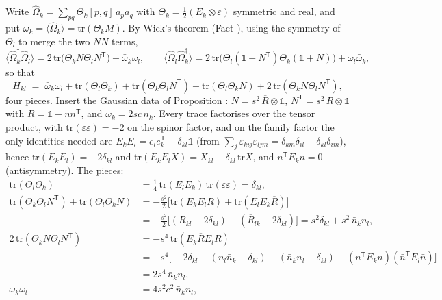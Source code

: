 Write $\hat\Omega_{k} = \sum_{pq}\Theta_{k}[p,q]\,a_{p}a_{q}$ with $\Theta_{k} = \tfrac12(E_{k} \otimes \varepsilon)$ symmetric and real, and put $\omega_{k} = \langle\hat\Omega_{k}\rangle = \mathrm{tr}(\Theta_{k}M)$. By Wick's theorem (Fact ), using the symmetry of $\Theta_{l}$ to merge the two $NN$ terms,
\[
\langle\hat\Omega_{k}^{\dagger}\hat\Omega_{l}\rangle = 2\,\mathrm{tr}\bigl(\Theta_{k}N\Theta_{l}N^{\mathsf{T}}\bigr) + \bar\omega_{k}\omega_{l}, \qquad
\langle\hat\Omega_{l}\hat\Omega_{k}^{\dagger}\rangle = 2\,\mathrm{tr}\bigl(\Theta_{l}(\mathbb{1}+N^{\mathsf{T}})\Theta_{k}(\mathbb{1}+N)\bigr) + \omega_{l}\bar\omega_{k},
\]
so that
\[
H_{kl} \;=\; \bar\omega_{k}\omega_{l} + \mathrm{tr}(\Theta_{l}\Theta_{k}) + \mathrm{tr}(\Theta_{k}\Theta_{l}N^{\mathsf{T}}) + \mathrm{tr}(\Theta_{l}\Theta_{k}N) + 2\,\mathrm{tr}(\Theta_{k}N\Theta_{l}N^{\mathsf{T}}),
\]
four pieces. Insert the Gaussian data of Proposition : $N = s^{2}\,\overline{R} \otimes \mathbb{1}$, $N^{\mathsf{T}} = s^{2}\,R \otimes \mathbb{1}$ with $R = \mathbb{1} - \bar{n}n^{\mathsf{T}}$, and $\omega_{k} = 2sc\,n_{k}$. Every trace factorises over the tensor product, with $\mathrm{tr}(\varepsilon\varepsilon) = -2$ on the spinor factor, and on the family factor the only identities needed are $E_{k}E_{l} = e_{l}e_{k}^{\mathsf{T}} - \delta_{kl}\mathbb{1}$ (from $\sum_{j}\varepsilon_{kij}\varepsilon_{ljm} = \delta_{km}\delta_{il} - \delta_{kl}\delta_{im}$), hence $\mathrm{tr}(E_{k}E_{l}) = -2\delta_{kl}$ and $\mathrm{tr}(E_{k}E_{l}X) = X_{kl} - \delta_{kl}\,\mathrm{tr}X$, and $n^{\mathsf{T}}E_{k}n = 0$ (antisymmetry). The pieces:
\begin{align*}
\mathrm{tr}(\Theta_{l}\Theta_{k}) &= \tfrac14\,\mathrm{tr}(E_{l}E_{k})\,\mathrm{tr}(\varepsilon\varepsilon) = \delta_{kl},\\
\mathrm{tr}(\Theta_{k}\Theta_{l}N^{\mathsf{T}}) + \mathrm{tr}(\Theta_{l}\Theta_{k}N) &= -\tfrac{s^{2}}{2}\bigl[\mathrm{tr}(E_{k}E_{l}R) + \mathrm{tr}(E_{l}E_{k}\overline{R})\bigr]\\
&= -\tfrac{s^{2}}{2}\bigl[(R_{kl} - 2\delta_{kl}) + (\overline{R}_{lk} - 2\delta_{kl})\bigr] = s^{2}\delta_{kl} + s^{2}\,\bar{n}_{k}n_{l},\\
2\,\mathrm{tr}(\Theta_{k}N\Theta_{l}N^{\mathsf{T}}) &= -s^{4}\,\mathrm{tr}(E_{k}\overline{R}E_{l}R)\\
&= -s^{4}\bigl[-2\delta_{kl} - (n_{l}\bar{n}_{k} - \delta_{kl}) - (\bar{n}_{k}n_{l} - \delta_{kl}) + (n^{\mathsf{T}}E_{k}n)(\bar{n}^{\mathsf{T}}E_{l}\bar{n})\bigr]\\
&= 2s^{4}\,\bar{n}_{k}n_{l},\\
\bar\omega_{k}\omega_{l} &= 4s^{2}c^{2}\,\bar{n}_{k}n_{l},
\end{align*}
